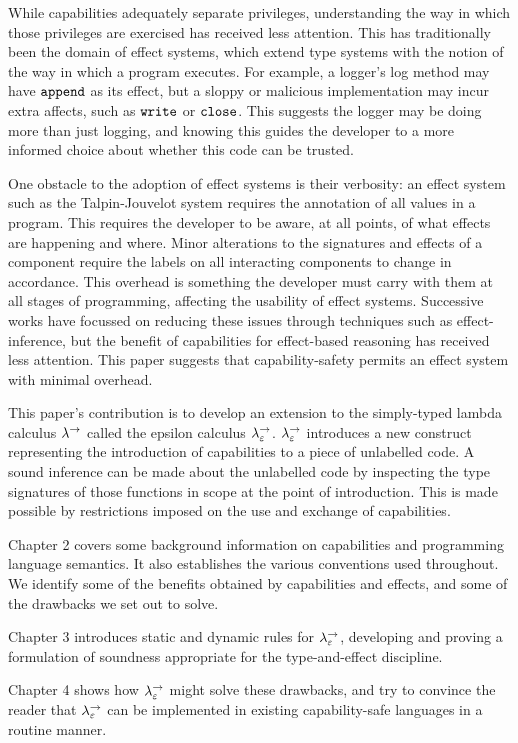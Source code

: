 While capabilities adequately separate privileges, understanding the way in which those privileges are exercised has received less attention. This has traditionally been the domain of effect systems, which extend type systems with the notion of the way in which a program executes. For example, a logger's log method may have $\mathtt{append}$ as its effect, but a sloppy or malicious implementation may incur extra affects, such as $\mathtt{write}$ or $\mathtt{close}$. This suggests the logger may be doing more than just logging, and knowing this guides the developer to a more informed choice about whether this code can be trusted.

One obstacle to the adoption of effect systems is their verbosity: an effect system such as the Talpin-Jouvelot system requires the annotation of all values in a program. This requires the developer to be aware, at all points, of what effects are happening and where. Minor alterations to the signatures and effects of a component require the labels on all interacting components to change in accordance. This overhead is something the developer must carry with them at all stages of programming, affecting the usability of effect systems. Successive works have focussed on reducing these issues through techniques such as effect-inference, but the benefit of capabilities for effect-based reasoning has received less attention. This paper suggests that capability-safety permits an effect system with minimal overhead.

This paper's contribution is to develop an extension to the simply-typed lambda calculus $\lambda^{\rightarrow}$ called the epsilon calculus $\lambda^{\rightarrow}_{\varepsilon}$. $\lambda^{\rightarrow}_{\varepsilon}$ introduces a new construct representing the introduction of capabilities to a piece of unlabelled code. A sound inference can be made about the unlabelled code by inspecting the type signatures of those functions in scope at the point of introduction. This is made possible by restrictions imposed on the use and exchange of capabilities.

Chapter 2 covers some background information on capabilities and programming language semantics. It also establishes the various conventions used throughout. We identify some of the benefits obtained by capabilities and effects, and some of the drawbacks we set out to solve.

Chapter 3 introduces static and dynamic rules for $\lambda^{\rightarrow}_{\varepsilon}$, developing and proving a formulation of soundness appropriate for the type-and-effect discipline. 

Chapter 4 shows how $\lambda^{\rightarrow}_{\varepsilon}$ might solve these drawbacks, and try to convince the reader that $\lambda^{\rightarrow}_{\varepsilon}$ can be implemented in existing capability-safe languages in a routine manner.
 
